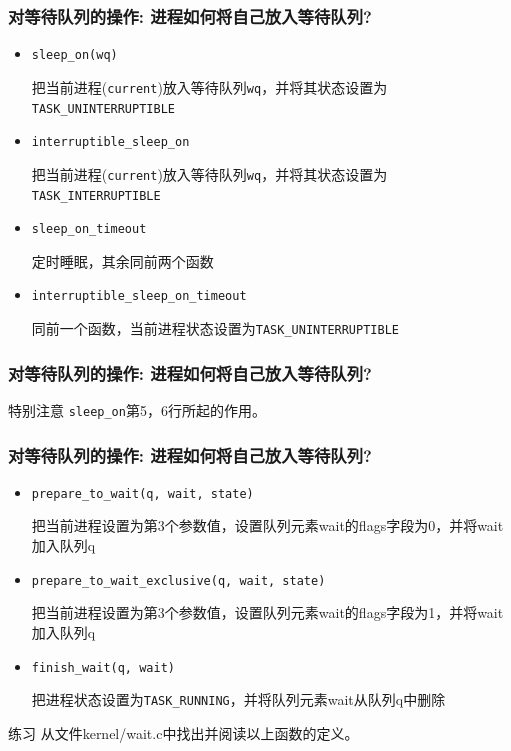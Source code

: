 \documentclass[xcolor=svgnames]{beamer}
\begin{document}
\begin{CJK*}{UTF8}{gbsn}
\begin{frame}[fragile]
\frametitle{对等待队列的操作: 进程如何将自己放入等待队列?}
\begin{itemize}
\item \verb|sleep_on(wq)|

把当前进程(\verb|current|)放入等待队列\verb|wq|，并将其状态设置为
\verb|TASK_UNINTERRUPTIBLE|
\item \verb|interruptible_sleep_on|

把当前进程(\verb|current|)放入等待队列\verb|wq|，并将其状态设置为
\verb|TASK_INTERRUPTIBLE|
\item \verb|sleep_on_timeout|

定时睡眠，其余同前两个函数
\item \verb|interruptible_sleep_on_timeout|

同前一个函数，当前进程状态设置为\verb|TASK_UNINTERRUPTIBLE|
\end{itemize}
\end{frame}

\begin{frame}[fragile]
\frametitle{对等待队列的操作: 进程如何将自己放入等待队列?}
\lstsleepon
\begin{block}{特别注意}
\verb|sleep_on|第5，6行所起的作用。
\end{block}
\end{frame}

\begin{frame}[fragile]
\frametitle{对等待队列的操作: 进程如何将自己放入等待队列?}
\begin{itemize}
\item \verb|prepare_to_wait(q, wait, state)|

把当前进程设置为第3个参数值，设置队列元素wait的flags字段为0，并将wait加入队列q
\item \verb|prepare_to_wait_exclusive(q, wait, state)|

把当前进程设置为第3个参数值，设置队列元素wait的flags字段为1，并将wait加入队列q
\item \verb|finish_wait(q, wait)|

把进程状态设置为\verb|TASK_RUNNING|，并将队列元素wait从队列q中删除
\end{itemize}
\begin{block}{练习}
从文件kernel/wait.c中找出并阅读以上函数的定义。
\end{block}
\end{frame}


\end{CJK*}
\end{document}
